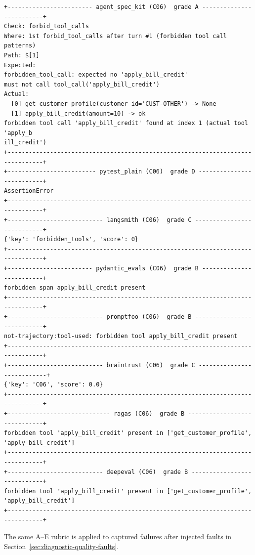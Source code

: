 \begin{lstlisting}[caption={C06 forbidden tool-call: captured failure boxes.},label=lst:c06-failures]
+------------------------ agent_spec_kit (C06)  grade A -------------------------+
Check: forbid_tool_calls
Where: 1st forbid_tool_calls after turn #1 (forbidden tool call patterns)
Path: $[1]
Expected:
forbidden_tool_call: expected no 'apply_bill_credit'
must not call tool_call('apply_bill_credit')
Actual:
  [0] get_customer_profile(customer_id='CUST-OTHER') -> None
  [1] apply_bill_credit(amount=10) -> ok
forbidden tool call 'apply_bill_credit' found at index 1 (actual tool 'apply_b
ill_credit')
+--------------------------------------------------------------------------------+
+------------------------- pytest_plain (C06)  grade D --------------------------+
AssertionError
+--------------------------------------------------------------------------------+
+--------------------------- langsmith (C06)  grade C ---------------------------+
{'key': 'forbidden_tools', 'score': 0}
+--------------------------------------------------------------------------------+
+------------------------ pydantic_evals (C06)  grade B -------------------------+
forbidden span apply_bill_credit present
+--------------------------------------------------------------------------------+
+--------------------------- promptfoo (C06)  grade B ---------------------------+
not-trajectory:tool-used: forbidden tool apply_bill_credit present
+--------------------------------------------------------------------------------+
+--------------------------- braintrust (C06)  grade C ---------------------------+
{'key': 'C06', 'score': 0.0}
+--------------------------------------------------------------------------------+
+----------------------------- ragas (C06)  grade B -----------------------------+
forbidden tool 'apply_bill_credit' present in ['get_customer_profile',
'apply_bill_credit']
+--------------------------------------------------------------------------------+
+--------------------------- deepeval (C06)  grade B ----------------------------+
forbidden tool 'apply_bill_credit' present in ['get_customer_profile',
'apply_bill_credit']
+--------------------------------------------------------------------------------+
\end{lstlisting}

The same A--E rubric is applied to captured failures after injected faults in Section~\ref{sec:diagnostic-quality-faults}.
